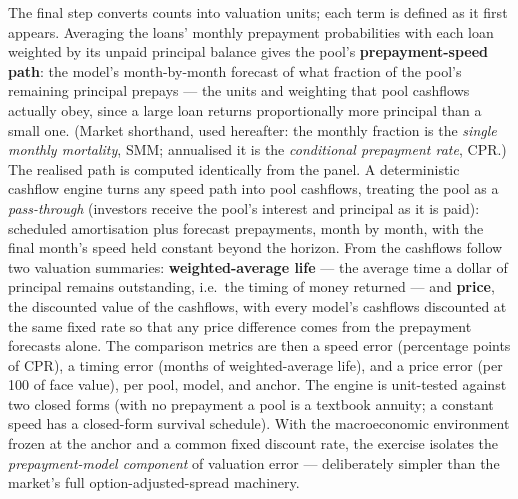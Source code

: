 The final step converts counts into valuation units; each term is
defined as it first appears.  Averaging the loans' monthly prepayment
probabilities with each loan weighted by its unpaid principal balance
gives the pool's \textbf{prepayment-speed path}: the model's
month-by-month forecast of what fraction of the pool's remaining
principal prepays --- the units and weighting that pool cashflows
actually obey, since a large loan returns proportionally more
principal than a small one.  (Market shorthand, used hereafter: the
monthly fraction is the \emph{single monthly mortality}, SMM;
annualised it is the \emph{conditional prepayment rate}, CPR.)  The
realised path is computed identically from the panel.  A
deterministic cashflow engine turns any speed path into pool
cashflows, treating the pool as a \emph{pass-through} (investors
receive the pool's interest and principal as it is paid): scheduled
amortisation plus forecast prepayments, month by month, with the
final month's speed held constant beyond the horizon.  From the
cashflows follow two valuation summaries: \textbf{weighted-average
life} --- the average time a dollar of principal remains outstanding,
i.e.\ the timing of money returned --- and \textbf{price}, the
discounted value of the cashflows, with every model's cashflows
discounted at the same fixed rate so that any price difference comes
from the prepayment forecasts alone.  The comparison metrics are then
a speed error (percentage points of CPR), a timing error (months of
weighted-average life), and a price error (per 100 of face value),
per pool, model, and anchor.  The engine is unit-tested against two
closed forms (with no prepayment a pool is a textbook annuity; a
constant speed has a closed-form survival schedule).  With the
macroeconomic environment frozen at the anchor and a common fixed
discount rate, the exercise isolates the \emph{prepayment-model
component} of valuation error --- deliberately simpler than the
market's full option-adjusted-spread machinery.

